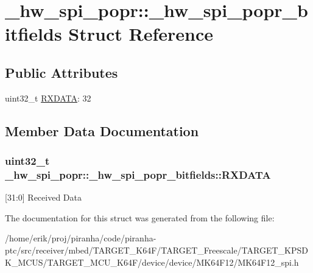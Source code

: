 \hypertarget{struct__hw__spi__popr_1_1__hw__spi__popr__bitfields}{}\section{\+\_\+hw\+\_\+spi\+\_\+popr\+:\+:\+\_\+hw\+\_\+spi\+\_\+popr\+\_\+bitfields Struct Reference}
\label{struct__hw__spi__popr_1_1__hw__spi__popr__bitfields}
\subsection*{Public Attributes}
\begin{DoxyCompactItemize}
\item 
uint32\+\_\+t \hyperlink{struct__hw__spi__popr_1_1__hw__spi__popr__bitfields_a5f16b2b9be0fe870e2f6ae782ce2f547}{R\+X\+D\+A\+TA}\+: 32
\end{DoxyCompactItemize}


\subsection{Member Data Documentation}
\subsubsection[{\texorpdfstring{R\+X\+D\+A\+TA}{RXDATA}}]{\setlength{\rightskip}{0pt plus 5cm}uint32\+\_\+t \+\_\+hw\+\_\+spi\+\_\+popr\+::\+\_\+hw\+\_\+spi\+\_\+popr\+\_\+bitfields\+::\+R\+X\+D\+A\+TA}\hypertarget{struct__hw__spi__popr_1_1__hw__spi__popr__bitfields_a5f16b2b9be0fe870e2f6ae782ce2f547}{}\label{struct__hw__spi__popr_1_1__hw__spi__popr__bitfields_a5f16b2b9be0fe870e2f6ae782ce2f547}
\mbox{[}31\+:0\mbox{]} Received Data 

The documentation for this struct was generated from the following file\+:\begin{DoxyCompactItemize}
\item 
/home/erik/proj/piranha/code/piranha-\/ptc/src/receiver/mbed/\+T\+A\+R\+G\+E\+T\+\_\+\+K64\+F/\+T\+A\+R\+G\+E\+T\+\_\+\+Freescale/\+T\+A\+R\+G\+E\+T\+\_\+\+K\+P\+S\+D\+K\+\_\+\+M\+C\+U\+S/\+T\+A\+R\+G\+E\+T\+\_\+\+M\+C\+U\+\_\+\+K64\+F/device/device/\+M\+K64\+F12/M\+K64\+F12\+\_\+spi.\+h\end{DoxyCompactItemize}
